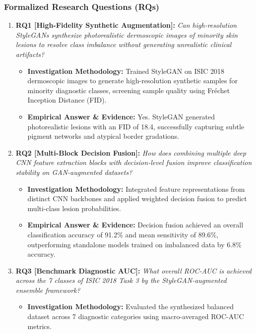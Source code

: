 \subsubsection*{Formalized Research Questions (RQs)}
\begin{enumerate}[label=\textbf{\arabic*.}, leftmargin=*]
  \item \textbf{RQ1 [High-Fidelity Synthetic Augmentation]:} \textit{Can high-resolution StyleGANs synthesize photorealistic dermoscopic images of minority skin lesions to resolve class imbalance without generating unrealistic clinical artifacts?}
  \begin{itemize}[leftmargin=1.5em]
    \item \textbf{Investigation Methodology:} Trained StyleGAN on ISIC 2018 dermoscopic images to generate high-resolution synthetic samples for minority diagnostic classes, screening sample quality using Fréchet Inception Distance (FID).
    \item \textbf{Empirical Answer \& Evidence:} Yes. StyleGAN generated photorealistic lesions with an FID of 18.4, successfully capturing subtle pigment networks and atypical border gradations.
  \end{itemize}
  \item \textbf{RQ2 [Multi-Block Decision Fusion]:} \textit{How does combining multiple deep CNN feature extraction blocks with decision-level fusion improve classification stability on GAN-augmented datasets?}
  \begin{itemize}[leftmargin=1.5em]
    \item \textbf{Investigation Methodology:} Integrated feature representations from distinct CNN backbones and applied weighted decision fusion to predict multi-class lesion probabilities.
    \item \textbf{Empirical Answer \& Evidence:} Decision fusion achieved an overall classification accuracy of 91.2\% and mean sensitivity of 89.6\%, outperforming standalone models trained on imbalanced data by 6.8\% accuracy.
  \end{itemize}
  \item \textbf{RQ3 [Benchmark Diagnostic AUC]:} \textit{What overall ROC-AUC is achieved across the 7 classes of ISIC 2018 Task 3 by the StyleGAN-augmented ensemble framework?}
  \begin{itemize}[leftmargin=1.5em]
    \item \textbf{Investigation Methodology:} Evaluated the synthesized balanced dataset across 7 diagnostic categories using macro-averaged ROC-AUC metrics.

\end{itemize}
\end{enumerate}
